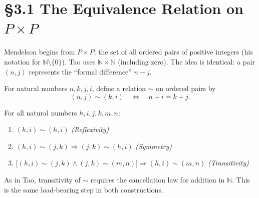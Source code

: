 
\section*{§3.1 \quad The Equivalence Relation on $P \times P$}

\begin{remark}
Mendelson begins from $P \times P$, the set of all ordered pairs of
positive integers (his notation for $\mathbb{N} \setminus \{0\}$).
Tao uses $\mathbb{N} \times \mathbb{N}$ (including zero).
The idea is identical: a pair $(n,j)$ represents the
``formal difference'' $n - j$.
\end{remark}

\begin{tcolorbox}[colback=corbox, colframe=corborder, arc=2pt,
  left=6pt, right=6pt, top=4pt, bottom=4pt,
  title={\small\textbf{Definition 3.1 (Equivalence relation on $P \times P$)}},
  fonttitle=\small\bfseries]
For natural numbers $n, k, j, i$, define a relation $\sim$ on
ordered pairs by
\[
(n,j) \sim (k,i)
\quad\Longleftrightarrow\quad
n + i = k + j.
\]
\end{tcolorbox}

\begin{theorem}
\label{thm:men-equiv}
For all natural numbers $h,i,j,k,m,n$:
\begin{enumerate}
  \item[\normalfont(R)] $(h,i) \sim (h,i)$ \hfill\textit{(Reflexivity)}
  \item[\normalfont(S)] $(h,i) \sim (j,k) \Rightarrow (j,k) \sim (h,i)$
    \hfill\textit{(Symmetry)}
  \item[\normalfont(T)] $\bigl[(h,i)\sim(j,k)\wedge(j,k)\sim(m,n)\bigr]
    \Rightarrow (h,i)\sim(m,n)$ \hfill\textit{(Transitivity)}
\end{enumerate}
\end{theorem}

\begin{remark}
As in Tao, transitivity of $\sim$ requires the cancellation law for
addition in $\mathbb{N}$.
This is the same load-bearing step in both constructions.
\end{remark}

